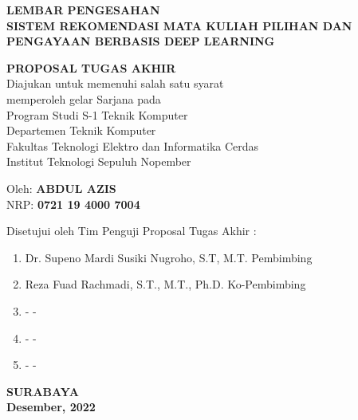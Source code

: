 {
\begin{center}
    \uppercase{\textbf{\large Lembar Pengesahan}} \\

    \vspace*{10mm}
    \uppercase{\textbf{Sistem rekomendasi Mata Kuliah Pilihan dan Pengayaan berbasis Deep Learning}}
    \vspace*{10mm}

    {
        \uppercase{\textbf{Proposal Tugas Akhir}} \\
        Diajukan untuk memenuhi salah satu syarat          \\
        memperoleh gelar Sarjana pada                      \\
        Program Studi S-1 Teknik Komputer                  \\
        Departemen Teknik Komputer                         \\
        Fakultas Teknologi Elektro dan Informatika Cerdas  \\
        Institut Teknologi Sepuluh Nopember                \\
    }

    \vspace*{1.5cm}
    Oleh: \textbf{\uppercase{Abdul Azis}}                          \\
    NRP: \textbf{0721 19 4000 7004}                    \\
    \vspace*{1.5cm}

    Disetujui oleh Tim Penguji Proposal Tugas Akhir :  \\
    \vspace*{5mm}

    \begin{enumerate}
        \setlength\itemsep{1.5em}
        \item Dr. Supeno Mardi Susiki Nugroho, S.T, M.T. \hfill Pembimbing
        \item Reza Fuad Rachmadi, S.T., M.T., Ph.D. \hfill Ko-Pembimbing
        \item - \hfill -
        \item - \hfill -
        \item - \hfill -
    \end{enumerate}

    \vspace*{1.5cm}
    \uppercase{\textbf{surabaya}}                      \\
    \textbf{Desember, 2022}                              \\
\end{center}
}
